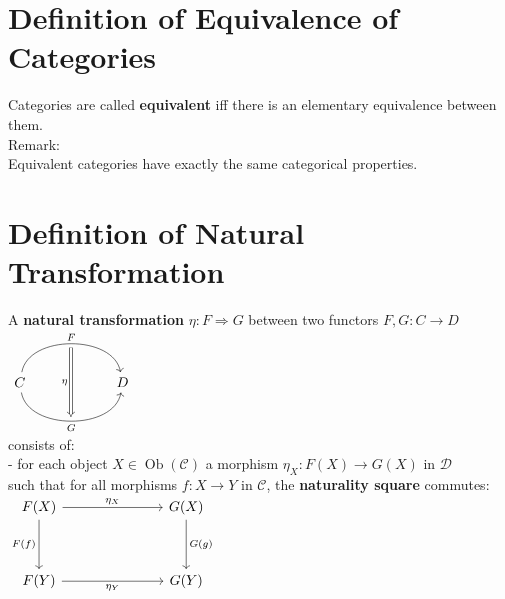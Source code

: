 \documentclass[a4paper, twoside, english, 11pt]{book}
\DeclareMathOperator{\Ob}{Ob}
\newcommand{\C}{\mathcal C}
\newcommand{\D}{\mathcal D}
\begin{document}
\section{Definition of Equivalence of Categories}

Categories are called \textbf{equivalent} iff there is an elementary equivalence between them. \\

\noindent
Remark: \\
Equivalent categories have exactly the same categorical properties.



\section{Definition of Natural Transformation}

A \textbf{natural transformation} $\eta : F \Rightarrow G$ between two functors $F, G : C \rightarrow D$ \\

$\begin{tikzcd}
                                                                & {} \arrow[dd, "\eta"', Rightarrow] &   \\
C \arrow[rr, "F", bend left=80] \arrow[rr, "G"', bend right=80] &                                    & D \\
                                                                & {}                                 &
\end{tikzcd}$ \\

\noindent
consists of: \\

- for each object $X \in \Ob(\C)$ a morphism $\eta_X : F(X) \rightarrow G(X)$ in $\D$ \\

\noindent
such that for all morphisms $f : X \rightarrow Y$ in $\C$, the \textbf{naturality square} commutes: \\

$\begin{tikzcd}
F(X) \arrow[rrr, "\eta_X"] \arrow[dd, "F(f)"'] &  &  & G(X) \arrow[dd, "G(g)"] \\
                                               &  &  &                         \\
F(Y) \arrow[rrr, "\eta_Y"']                    &  &  & G(Y)
\end{tikzcd}$
\end{document}
